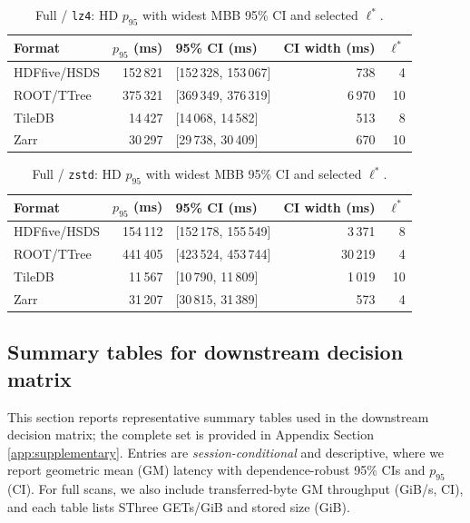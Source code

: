 \documentclass[nomenclature, english, bibtex]{kththesis}
\numberwithin{listing}{chapter}
\begin{document}
\begin{table}[H]
  \centering
  \caption{Full / \texttt{lz4}: \gls{HD} $p_{95}$ with widest \gls{MBB} 95\% \gls{CI} and selected $\ell^{\ast}$.}
  \label{tab:tail-full-lz4-p95-selected}
  \begin{tabular}{l r l r r}
    \toprule
    Format & $p_{95}$ (ms) & 95\% \gls{CI} (ms) & \gls{CI} width (ms) & $\ell^{\ast}$ \\
    \midrule
    \gls{HDFfive}/\gls{HSDS}   & 152\,821 & [152\,328, 153\,067] & 738  & 4 \\
    \gls{ROOT}/\gls{TTree}   & 375\,321 & [369\,349, 376\,319] & 6\,970 & 10 \\
    TileDB & 14\,427  & [14\,068, 14\,582]   & 513  & 8 \\
    Zarr   & 30\,297  & [29\,738, 30\,409]   & 670  & 10 \\
    \bottomrule
  \end{tabular}
\end{table}

\begin{table}[H]
  \centering
  \caption{Full / \texttt{zstd}: \gls{HD} $p_{95}$ with widest \gls{MBB} 95\% \gls{CI} and selected $\ell^{\ast}$.}
  \label{tab:tail-full-zstd-p95-selected}
  \begin{tabular}{l r l r r}
    \toprule
    Format & $p_{95}$ (ms) & 95\% \gls{CI} (ms) & \gls{CI} width (ms) & $\ell^{\ast}$ \\
    \midrule
    \gls{HDFfive}/\gls{HSDS}   & 154\,112 & [152\,178, 155\,549] & 3\,371 & 8 \\
    \gls{ROOT}/\gls{TTree}   & 441\,405 & [423\,524, 453\,744] & 30\,219 & 4 \\
    TileDB & 11\,567  & [10\,790, 11\,809]   & 1\,019  & 10 \\
    Zarr   & 31\,207  & [30\,815, 31\,389]   & 573    & 4 \\
    \bottomrule
  \end{tabular}
\end{table}

\subsection{Summary tables for downstream decision matrix}
This section reports representative summary tables used in the downstream decision matrix; the complete set is provided in Appendix Section \ref{app:supplementary}. Entries are \emph{session-conditional} and descriptive, where we report geometric mean (\gls{GM}) latency with dependence-robust 95\% \glspl{CI} and $p_{95}$ (\gls{CI}). For full scans, we also include transferred-byte \gls{GM} throughput (GiB/s, \gls{CI}), and each table lists \gls{SThree} GETs/GiB and stored size (GiB).
\end{document}
